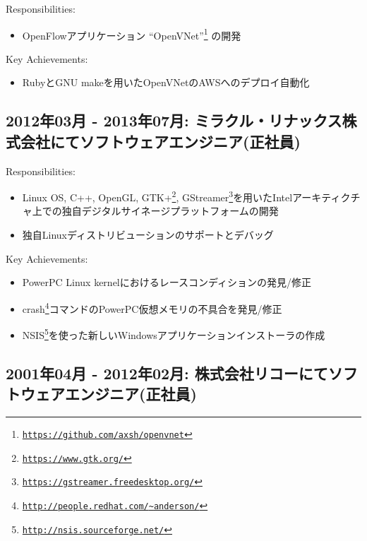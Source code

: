 \documentclass[letterpaper]{article}
\begin{document}
\noindent Responsibilities:

\begin{itemize}
  \item OpenFlowアプリケーション ``OpenVNet''\footnote{\href{https://github.com/axsh/openvnet}{\tt https://github.com/axsh/openvnet}} の開発
\end{itemize}

\noindent Key Achievements:

\begin{itemize}
  \item RubyとGNU makeを用いたOpenVNetのAWSへのデプロイ自動化
\end{itemize}

\subsection*{2012年03月 - 2013年07月: ミラクル・リナックス株式会社にてソフトウェアエンジニア(正社員)}

\noindent Responsibilities:

\begin{itemize}
  \item Linux OS, C++, OpenGL, GTK+\footnote{\href{https://www.gtk.org/}{\tt https://www.gtk.org/}}, GStreamer\footnote{\href{https://gstreamer.freedesktop.org/}{\tt https://gstreamer.freedesktop.org/}}を用いたIntelアーキティクチャ上での独自デジタルサイネージプラットフォームの開発
  \item 独自Linuxディストリビューションのサポートとデバッグ
\end{itemize}

\noindent Key Achievements:

\begin{itemize}
  \item PowerPC Linux kernelにおけるレースコンディションの発見/修正
  \item crash\footnote{\href{http://people.redhat.com/{\textasciitilde}anderson/}{\tt http://people.redhat.com/{\textasciitilde}anderson/}}コマンドのPowerPC仮想メモリの不具合を発見/修正
  \item NSIS\footnote{\href{http://nsis.sourceforge.net/}{\tt http://nsis.sourceforge.net/}}を使った新しいWindowsアプリケーションインストーラの作成
\end{itemize}

\subsection*{2001年04月 - 2012年02月: 株式会社リコーにてソフトウェアエンジニア(正社員)}
\end{document}
